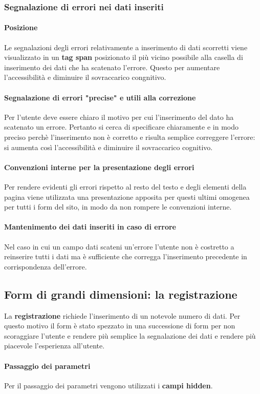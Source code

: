 \documentclass[12pt,a4paper]{article}
\begin{document}
\subsubsection{Segnalazione di errori nei dati inseriti}
\paragraph{Posizione} Le segnalazioni degli errori relativamente a inserimento di dati scorretti viene visualizzato in un \textbf{tag span} posizionato il più vicino possibile alla casella di inserimento dei dati che ha scatenato l'errore. Questo per aumentare l'accessibilità e diminuire il sovraccarico congnitivo. 
\paragraph{Segnalazione di errori "precise" e utili alla correzione} Per l'utente deve essere chiaro il motivo per cui l'inserimento del dato ha scatenato un errore. Pertanto si cerca di specificare chiaramente e in modo preciso perchè l'inserimento non è corretto e risulta semplice correggere l'errore: si aumenta così l'accessibilità e diminuire il sovraccarico cognitivo. 
\paragraph{Convenzioni interne per la presentazione degli errori} Per rendere evidenti gli errori rispetto al resto del testo e degli elementi della pagina viene utilizzata una presentazione apposita per questi ultimi omogenea per tutti i form del sito, in modo da non rompere le convenzioni interne.
\paragraph{Mantenimento dei dati inseriti in caso di errore} 
Nel caso in cui un campo dati scateni un'errore l'utente non è costretto a reinserire tutti i dati ma è sufficiente che corregga l'inserimento precedente in corrispondenza dell'errore. 
\subsection{Form di grandi dimensioni: la registrazione} 
La \textbf{registrazione} richiede l'inserimento di un notevole numero di dati. Per questo motivo il form è stato spezzato in una successione di form per non scoraggiare l'utente e rendere più semplice la segnalazione dei dati e rendere più piacevole l'esperienza all'utente. 
\paragraph{Passaggio dei parametri} Per il passaggio dei parametri vengono utilizzati i \textbf{campi hidden}. 
\end{document}
